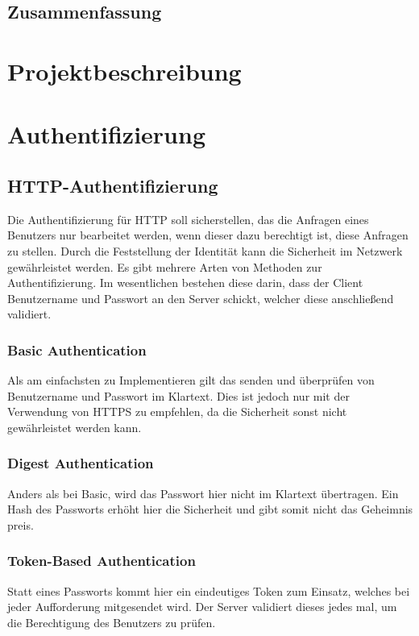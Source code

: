 







\section*{Zusammenfassung}	
\lipsum

\chapter{Projektbeschreibung}


\chapter{Authentifizierung}
\section{HTTP-Authentifizierung}
Die Authentifizierung für HTTP soll sicherstellen, das die Anfragen eines Benutzers nur bearbeitet werden, wenn dieser dazu berechtigt ist, diese Anfragen zu stellen. Durch die Feststellung der Identität kann die Sicherheit im Netzwerk gewährleistet werden. Es gibt mehrere Arten von Methoden zur Authentifizierung. Im wesentlichen bestehen diese darin, dass der Client Benutzername und Passwort an den Server schickt, welcher diese anschließend validiert.
\subsection{Basic Authentication}
Als am einfachsten zu Implementieren gilt das senden und überprüfen von Benutzername und Passwort im Klartext. Dies ist jedoch nur mit der Verwendung von HTTPS zu empfehlen, da die Sicherheit sonst nicht gewährleistet werden kann.
\subsection{Digest Authentication}
Anders als bei Basic, wird das Passwort hier nicht im Klartext übertragen. Ein Hash des Passworts erhöht hier die Sicherheit und gibt somit nicht das Geheimnis preis.
\subsection{Token-Based Authentication}
Statt eines Passworts kommt hier ein eindeutiges Token zum Einsatz, welches bei jeder Aufforderung mitgesendet wird. Der Server validiert dieses jedes mal, um die Berechtigung des Benutzers zu prüfen.
